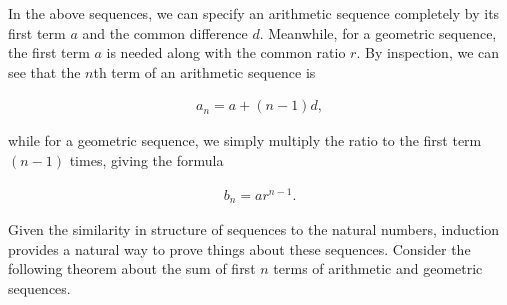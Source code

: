 \documentclass[twoside]{report}
\begin{document}
In the above sequences, we can specify an arithmetic sequence completely by its first term $a$ and the common difference $d$. Meanwhile, for a geometric sequence, the first term $a$ is needed along with the common ratio $r$. By inspection, we can see that the $n$th term of an arithmetic sequence is

\begin{align*}
	a_n = a + (n - 1)d,
\end{align*}

while for a geometric sequence, we simply multiply the ratio to the first term $(n - 1)$ times, giving the formula

\begin{align*}
	b_n = a r^{n - 1}.
\end{align*}

Given the similarity in structure of sequences to the natural numbers, induction provides a natural way to prove things about these sequences. Consider the following theorem about the sum of first $n$ terms of arithmetic and geometric sequences.
\end{document}
